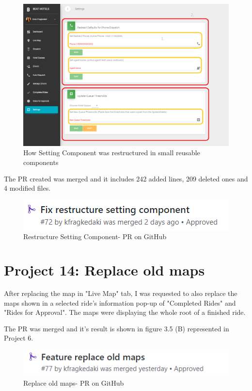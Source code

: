 \begin{figure}[H]
	\begin{center}
		\includegraphics[scale=0.45]{images/my_projects/fix-restructure-setting-component.png}
	\end{center}
	\caption{How Setting Component was restructured in small reusable components}
\end{figure}

The PR created was merged and it includes 242 added lines, 209 deleted ones and 4 modified files. \par

\begin{figure}[H]
	\begin{center}
		\includegraphics[scale=0.85]{images/my_projects/fix-restructure-setting-component-PR.png}
	\end{center}
	\caption{Restructure Setting Component- PR on GitHub}
\end{figure}

\section{Project 14: Replace old maps}

After replacing the map in "Live Map" tab, I was requested to also replace the maps shown in a selected ride's information pop-up of "Completed Rides" and "Rides for Approval". The maps were displaying the whole root of a finished ride. 

The PR was merged and it's result is shown in figure 3.5 (B) represented in Project 6.

\begin{figure}[H]
	\begin{center}
		\includegraphics[scale=0.85]{images/my_projects/feature-replace-old-maps-PR.png}
	\end{center}
	\caption{Replace old maps- PR on GitHub}
\end{figure}
